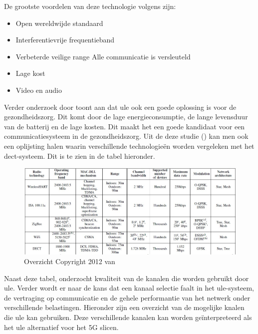 De grootste voordelen van deze technologie volgens \textcite{GariniDil2014} zijn:

\begin{itemize}
  \item Open wereldwijde standaard
  \item Interferentievrije frequentieband
  \item Verbeterde veilige range
  \subitem Alle communicatie is versleuteld
  \item Lage kost
  \item Video en audio
\end{itemize}


Verder onderzoek door \textcite{Das2012} toont aan dat \gls{ule} ook een goede oplossing is voor de gezondheidszorg. Dit komt door de lage energieconsumptie, de lange levensduur van de batterij en de lage kosten. Dit maakt het een goede kandidaat voor een communicatiesysteem in de gezondheidszorg. Uit de deze studie (\textcite{Das2012}) kan men ook een oplijsting halen waarin verschillende technologieën worden vergeleken met het \gls{dect}-systeem. Dit is te zien in de tabel hieronder.

\begin{figure}[H]
  \includegraphics[width=\linewidth]{../graphics/overzicht.jpg}
  \caption{Overzicht \autocite[Door][]{Das2012} Copyright 2012 van \textcite{Das2012}}
  \label{fig:overzicht}
\end{figure}


Naast deze tabel, onderzocht \textcite{Das2012} kwaliteit van de kanalen die worden gebruikt door \gls{ule}. Verder wordt er naar de kans dat een kanaal selectie faalt in het \gls{ule}-systeem, de vertraging op communicatie en de gehele performantie van het netwerk onder verschillende belastingen. Hieronder zijn een overzicht van de mogelijke knalen die \gls{ule} kan gebruiken. Deze verschillende kanalen kan worden geïnterpreteerd als het \gls{ule} alternatief voor het 5G slicen.

